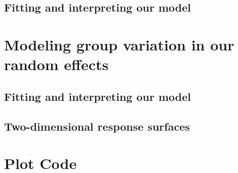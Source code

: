 \documentclass[
]{book}
\begin{document}
\hypertarget{fitting-and-interpreting-our-model}{%
\subsection{Fitting and interpreting our model}\label{fitting-and-interpreting-our-model}}

\hypertarget{modeling-group-variation-in-our-random-effects}{%
\section{Modeling group variation in our random effects}\label{modeling-group-variation-in-our-random-effects}}

\hypertarget{fitting-and-interpreting-our-model-1}{%
\subsection{Fitting and interpreting our model}\label{fitting-and-interpreting-our-model-1}}

\hypertarget{two-dimensional-response-surfaces}{%
\subsection{Two-dimensional response surfaces}\label{two-dimensional-response-surfaces}}

\hypertarget{plot-code-9}{%
\section{Plot Code}\label{plot-code-9}}
\end{document}
